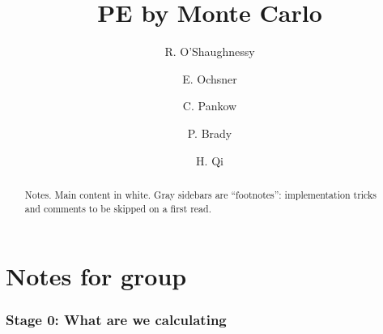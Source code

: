 \documentclass[twocolumn,prd,nofootinbib]{revtex4}
\begin{document}
\title{PE by Monte Carlo}
\author{R. O'Shaughnessy}
\author{E. Ochsner}
\author{C. Pankow}
\author{P. Brady}
\author{H. Qi}
\begin{abstract}
Notes. Main content in white.  Gray sidebars are ``footnotes'': implementation tricks and comments to be skipped on a
first read.
\end{abstract}
\maketitle
\tableofcontents
\part{Notes for group}
\nocite{gwastro-HarryFairhurst-CoherentTargetedSearch}

\section{Stage 0: What are we calculating}
\end{document}
